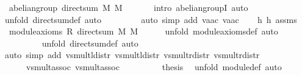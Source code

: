 \begin{isabellebody}
\ {}{\isacharcolon}\ {\isachardoublequoteopen}abelian{\isacharunderscore}group\ {\isacharparenleft}direct{\isacharunderscore}sum\ M{}\ M{}{\isacharparenright}{\isachardoublequoteclose}\ \isanewline
\ \ \ \ \isamarkupfalse%
\ {\isacharparenleft}intro\ abelian{\isacharunderscore}groupI{\isacharcomma}\ auto{\isacharparenright}\isanewline
\ \ \ \ \ \ \ \ \ \isamarkupfalse%
\ {\isacharparenleft}unfold\ direct{\isacharunderscore}sum{\isacharunderscore}def{\isacharcomma}\ auto{\isacharparenright}\isanewline
\ \ \ \ \ \ \ \isamarkupfalse%
\ {\isacharparenleft}auto\ simp\ add{\isacharcolon}\ v{}{\isachardot}a{\isacharunderscore}ac\ v{}{\isachardot}a{\isacharunderscore}ac{\isacharparenright}\isanewline
\ \ \isamarkupfalse%
\ h{}\ h{}\ assms\ \isamarkupfalse%
\ {}{\isacharcolon}\ {\isachardoublequoteopen}module{\isacharunderscore}axioms\ R\ {\isacharparenleft}direct{\isacharunderscore}sum\ M{}\ M{}{\isacharparenright}{\isachardoublequoteclose}\isanewline
\ \ \ \ \isamarkupfalse%
\ {\isacharparenleft}unfold\ module{\isacharunderscore}axioms{\isacharunderscore}def{\isacharcomma}\ auto{\isacharparenright}\isanewline
\ \ \ \ \ \ \ \ \isamarkupfalse%
\ {\isacharparenleft}unfold\ direct{\isacharunderscore}sum{\isacharunderscore}def{\isacharcomma}\ auto{\isacharparenright}\isanewline
\ \ \ \ \ \ \ \ \ \isamarkupfalse%
\ {\isacharparenleft}auto\ simp\ add{\isacharcolon}\ v{}{\isachardot}smult{\isacharunderscore}l{\isacharunderscore}distr\ v{}{\isachardot}smult{\isacharunderscore}l{\isacharunderscore}distr\ v{}{\isachardot}smult{\isacharunderscore}r{\isacharunderscore}distr\ v{}{\isachardot}smult{\isacharunderscore}r{\isacharunderscore}distr\isanewline
\ \ \ \ \ \ v{}{\isachardot}smult{\isacharunderscore}assoc{}\ v{}{\isachardot}smult{\isacharunderscore}assoc{}{\isacharparenright}\isanewline
\ \ \isamarkupfalse%
\ {}\ {}\ {}\ \ \isamarkupfalse%
\ {\isacharquery}thesis\ \isamarkupfalse%
\ {\isacharparenleft}unfold\ module{\isacharunderscore}def{\isacharcomma}\ auto{\isacharparenright}\isanewline
{}\isamarkupfalse%
%
\endisatagproof
{\isafoldproof}%
%
\isadelimproof
\isanewline
%
\endisadelimproof
\isanewline
{}\isamarkupfalse%

\end{isabellebody}
